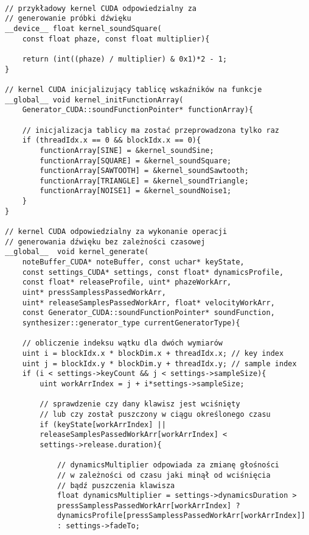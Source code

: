 \begin{lstlisting}

// przykładowy kernel CUDA odpowiedzialny za 
// generowanie próbki dźwięku
__device__ float kernel_soundSquare(
    const float phaze, const float multiplier){

    return (int((phaze) / multiplier) & 0x1)*2 - 1;
}

// kernel CUDA inicjalizujący tablicę wskaźników na funkcje
__global__ void kernel_initFunctionArray(
    Generator_CUDA::soundFunctionPointer* functionArray){

    // inicjalizacja tablicy ma zostać przeprowadzona tylko raz
    if (threadIdx.x == 0 && blockIdx.x == 0){
        functionArray[SINE] = &kernel_soundSine;
        functionArray[SQUARE] = &kernel_soundSquare;
        functionArray[SAWTOOTH] = &kernel_soundSawtooth;
        functionArray[TRIANGLE] = &kernel_soundTriangle;
        functionArray[NOISE1] = &kernel_soundNoise1;
    }
}

// kernel CUDA odpowiedzialny za wykonanie operacji
// generowania dźwięku bez zależności czasowej
__global__  void kernel_generate(
    noteBuffer_CUDA* noteBuffer, const uchar* keyState,
    const settings_CUDA* settings, const float* dynamicsProfile,
    const float* releaseProfile, uint* phazeWorkArr,
    uint* pressSamplessPassedWorkArr,
    uint* releaseSamplesPassedWorkArr, float* velocityWorkArr,
    const Generator_CUDA::soundFunctionPointer* soundFunction,
    synthesizer::generator_type currentGeneratorType){

    // obliczenie indeksu wątku dla dwóch wymiarów
    uint i = blockIdx.x * blockDim.x + threadIdx.x; // key index
    uint j = blockIdx.y * blockDim.y + threadIdx.y; // sample index
    if (i < settings->keyCount && j < settings->sampleSize){
        uint workArrIndex = j + i*settings->sampleSize;
        
        // sprawdzenie czy dany klawisz jest wciśnięty
        // lub czy został puszczony w ciągu określonego czasu
        if (keyState[workArrIndex] ||
        releaseSamplesPassedWorkArr[workArrIndex] <
        settings->release.duration){

            // dynamicsMultiplier odpowiada za zmianę głośności
            // w zależności od czasu jaki minął od wciśnięcia
            // bądź puszczenia klawisza
            float dynamicsMultiplier = settings->dynamicsDuration >
            pressSamplessPassedWorkArr[workArrIndex] ? 
            dynamicsProfile[pressSamplessPassedWorkArr[workArrIndex]]
            : settings->fadeTo;


\end{lstlisting}
